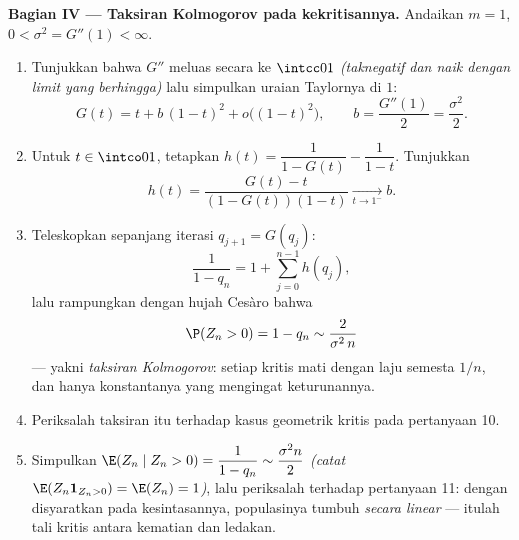 \begin{problem}
\medskip
\noindent\textbf{Bagian IV --- Taksiran Kolmogorov pada
kekritisannya.} Andaikan $m = 1$, $0 < \sigma^2 = G''(1) <
\infty$.
\begin{enumerate}[resume]
  \item Tunjukkan bahwa $G''$ meluas secara  ke $\intcc01$
        \emph{(taknegatif dan naik dengan limit yang berhingga)} lalu
        simpulkan uraian Taylornya di $1$:
        \[
        G(t) = t + b\,(1-t)^2 + o\bigl((1-t)^2\bigr),
        \qquad b = \frac{G''(1)}2 = \frac{\sigma^2}2 .
        \]
  \item Untuk $t \in \intco01$, tetapkan $h(t) = \dfrac1{1 - G(t)} -
        \dfrac1{1 - t}$. Tunjukkan
        \[
        h(t) = \frac{G(t) - t}{(1 - G(t))(1 - t)}
        \xrightarrow[t\to1^-]{} b .
        \]
  \item Teleskopkan sepanjang iterasi $q_{j+1} = G(q_j)$:
        \[
        \frac1{1 - q_n} = 1 + \sum_{j=0}^{n-1}h(q_j),
        \]
        lalu rampungkan dengan hujah Cesàro bahwa
        \[
        \P(Z_n > 0) = 1 - q_n \sim \frac{2}{\sigma^2\,n}
        \]
        --- yakni \emph{taksiran Kolmogorov}: setiap 
        kritis mati dengan laju semesta $1/n$,
        dan hanya konstantanya yang mengingat  keturunannya.
  \item Periksalah taksiran itu terhadap kasus geometrik
        kritis pada pertanyaan 10.
  \item Simpulkan $\E(Z_n \mid Z_n > 0) = \dfrac{1}{1 - q_n}
        \sim \dfrac{\sigma^2 n}{2}$ \emph{(catat $\E(Z_n
        \mathbf 1_{Z_n>0}) = \E(Z_n) = 1$)}, lalu periksalah
        terhadap pertanyaan 11: dengan disyaratkan pada kesintasannya,
        populasinya tumbuh \emph{secara linear} --- itulah tali
        kritis antara kematian dan ledakan.
\end{enumerate}


\end{problem}
